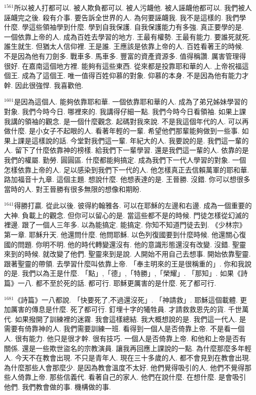 \documentclass{book}
\begin{document}
$^{1561}$所以被人打都可以.
被人欺負都可以.
被人污衊他.
被人誣衊他都可以.
我們被人誣衊完之後.
殺有介事.
要告訴全世界的人.
為何要誣衊我.
我不是這樣的.
我們學什麼.
學這些領袖學到什麼.
學到自我保護.
自我保護能力有多強.
真正要學的是.
一個依靠上帝的人.
成為百姓去學習的地方.
王最有權勢.
王最有能力.
要誰死就死.
誰生就生.
但猶太人信仰裡.
王是誰.
王應該是依靠上帝的人.
百姓看著王的時候.
不是因為他有刀劍多.
戰車多.
馬車多.
豐富的資產資源多.
值得稱讚.
厲害管理得很好.
在嘉南這個地方裡.
能夠有這些東西.
從來都是投靠耶和華的人.
上帝祝福這個王.
成為了這個王.
唯一值得百姓仰慕的對象.
仰慕的本身.
不是因為他有能力才幹.
因此很強悍.
我喜歡他.

$^{1601}$是因為這個人.
能夠依靠耶和華.
一個依靠耶和華的人.
成為了弟兄姊妹學習的對象.
我們今時今日.
哪裡來的.
我講得仔細一點.
我們今時今日看領袖.
如果上課我講的領袖的觀念.
是一個什麼觀念.
起碼對我來說.
不是我這個年代的人.
可以再做什麼.
是小女子不起眼的人.
看著年輕的一輩.
希望他們那輩能夠做到一些事.
如果上課是這樣說的話.
今堂對我們這一輩.
年紀大的人.
我要說的是.
我們這一輩的人.
留下了什麼依靠神的榜樣.
給我們下一輩學習.
還是我們這一輩的人.
依靠的是我們的權屬.
勤勞.
圓圓區.
什麼都能夠搞定.
成為我們下一代人學習的對象.
一個怎樣依靠上帝的人.
足以感染到我們下一代的人.
他怎樣真正去信賴萬軍的耶和華.
路加福音十九章.
這個主題.
想說什麼.
他想表達的是.
王晉勝.
沒錯.
你可以想很多當時的人.
對王晉勝有很多無限的想像和期盼.

$^{1641}$得勝打贏.
從此以後.
彼得約翰雅各.
可以在耶穌的左邊和右邊.
成為一個重要的大神.
負載上的觀念.
但你可以留心的是.
當這些都不是的時候.
門徒怎樣從幻滅的裡邊.
跟了一個人三年多.
以為能搞定.
能搞定.
你知不知道門徒去到.
《少林宗》第一章.
耶穌升天.
他還問什麼.
他問耶穌.
以色列復國要到什麼時候.
他還關心復國的問題.
你明不明.
他的時代轉變還沒有.
他的意識形態還沒有改變.
沒錯.
聖靈來到的時候.
就改變了他們.
聖靈來到是說.
人開始不用自己去想事.
開始依靠聖靈.
跟著聖靈的帶領.
去學習什麼叫依靠上帝.
「奉主明來的王是很稱重的」.
你和我說的是.
我們以為王是什麼.
「點」,「德」,「特勝」,「榮耀」.
「那知」.
如果《詩篇》一八.
都不至於死的話.
都可行.
耶穌更厲害的是什麼.
死了都可行.

$^{1681}$《詩篇》一八都說.
「快要死了,不過還沒死」.
「神請救」.
耶穌這個載體.
更加厲害的傳息是什麼.
死了都可行.
釘埋十字的犧牲員.
才請救救恩先的貨.
千世萬代.
如果撥開了訓練裡的迷霧.
我會這樣總結.
我大概想說的是.
我們這一代人.
是需要有倚靠神的人.
我們需要訓練一班.
看得到一個人是否倚靠上帝.
不是看一個人.
很有能力.
他只是很才幹.
很有技巧.
一個人是否倚靠上帝.
和他和上帝是否有關係.
還是一些欺世盜名的宗教演員.
讓我再回應上課說的一點.
為什麼那麼多年輕人.
今天不在教會出現.
不只是青年人.
現在三十多歲的人.
都不會見到在教會出現.
為什麼那些人會那麼少.
是因為教會溫度不太好.
他們覺得吸引的人.
他們不覺得那些人倚靠上帝.
那些信義代.
看著自己的家人.
他們在說什麼.
在想什麼.
是會吸引他們.
我們教會做的事.
機構做的事.
\end{document}
